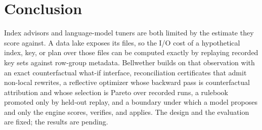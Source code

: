 \section{Conclusion}\label{sec:conclusion}

Index advisors and language-model tuners are both limited by the estimate they
score against. A data lake exposes its files, so the I/O cost of a hypothetical
index, key, or plan over those files can be computed exactly by replaying
recorded key sets against row-group metadata. Bellwether builds on that
observation with an exact counterfactual what-if interface, reconciliation
certificates that admit non-local rewrites, a reflective optimizer whose
backward pass is counterfactual attribution and whose selection is Pareto over
recorded runs, a rulebook promoted only by held-out replay, and a boundary under
which a model proposes and only the engine scores, verifies, and applies. The
design and the evaluation are fixed; the results are pending.
